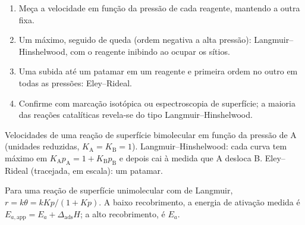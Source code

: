 \begin{method}\label{met:b3:surfaces-catalysis:mechanism-from-rate}
\begin{enumerate}
  \item Meça a velocidade em função da pressão de cada reagente, mantendo a outra
        fixa.
  \item Um máximo, seguido de queda (ordem negativa a alta pressão):
        Langmuir--Hinshelwood, com o reagente inibindo ao ocupar os sítios.
  \item Uma subida até um patamar em um reagente e primeira ordem no outro em todas
        as pressões: Eley--Rideal.
  \item Confirme com marcação isotópica ou espectroscopia de superfície; a maioria
        das reações catalíticas revela-se do tipo Langmuir--Hinshelwood.
\end{enumerate}
\end{method}

\begin{omfigure}

{\small Velocidades de uma reação de superfície bimolecular em função da pressão de A
(unidades reduzidas, $K_{\mathrm A} = K_{\mathrm B} = 1$). Langmuir--Hinshelwood: cada curva tem máximo em $K_{\mathrm A}p_{\mathrm A} =
1 + K_{\mathrm B}p_{\mathrm B}$ e depois cai à medida que A desloca B. Eley--Rideal (tracejada, em escala): um patamar.}
\end{omfigure}

\begin{proposition}\label{prop:b3:surfaces-catalysis:apparent-ea}
Para uma reação de superfície unimolecular com  de Langmuir, $r = k\theta = kKp/(1 + Kp)$.
A baixo recobrimento, a energia de ativação medida é $E_{a,\mathrm{app}} = E_a + \Delta_{\mathrm{ads}}H$; a
alto recobrimento, é $E_a$.
\end{proposition}

